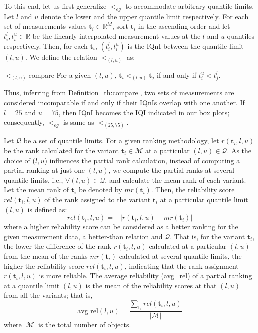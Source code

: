 \documentclass[acmsmall,screen, review]{acmart}
\begin{document}
To this end, let us first generalize $<_{eg}$ to accommodate arbitrary quantile limits. Let $l$ and $u$ denote  the lower and the upper quantile limit respectively. For each set of measurements values $\mathbf{t}_i \in \mathbb{R}^{M}$,  sort $\mathbf{t}_i$ in the ascending order and let $t_i^{l}, t_i^{u} \in \mathbb{R}$ be the linearly interpolated measurement values at the $l$ and $u$ quantiles respectively. Then, for each $\mathbf{t}_i$, $(t_i^{l}, t_i^{u})$ is the IQnI between the quantile limit $(l,u)$. We define the relation  $<_{(l,u)}$ as:

\begin{mydef}{$<_{(l,u)}$}{compare}
	For a given $(l, u)$, $\mathbf{t}_i <_{(l,u)} \mathbf{t}_j$ if and only if $t_i^{u} < t_j^{l}$.
\end{mydef}

\noindent  Thus, inferring from Definition~\ref{th:compare}, two sets of measurements are considered incomparable if and only if their IQnIs overlap with one another. If $l = 25$  and $u = 75$, then IQnI becomes the IQI indicated in our box plots; consequently, $<_{eg}$ is same as $<_{(25,75)}$.


Let $\mathcal{Q}$ be a set of quantile limits. For a given ranking methodology, let $r(\mathbf{t}_i, l, u)$ be the rank calculated for the variant $\mathbf{t}_i \in \mathcal{M}$ at a particular $(l, u) \in \mathcal{Q}$. As the choice of ($l, u$) influences the partial rank calculation, instead of computing a partial ranking at just one $(l,u)$, we compute the partial ranks at several quantile limits, i.e., $\forall (l,u) \in \mathcal{Q}$, and calculate the mean rank of each variant. Let the mean rank of $\mathbf{t}_i$ be denoted by $mr(\mathbf{t}_i)$. Then, the reliability score $rel(\mathbf{t}_i, l,u)$ of the rank assigned to the variant $\mathbf{t}_i$ at a particular quantile limit $(l,u)$ is defined as:
\begin{equation}
\label{eq:rel-eq}
rel(\mathbf{t}_i, l, u) = -|r(\mathbf{t}_i,l, u) - mr(\mathbf{t}_i)|
\end{equation}
where a higher reliability score can be considered as a better ranking for the given measurement data, a better-than relation and $\mathcal{Q}$. That is, for the variant $\mathbf{t}_i$, the lower the difference of the rank $r(\mathbf{t}_i, l,u)$ calculated at a particular $(l,u)$ from the mean of the ranks $mr(\mathbf{t}_i)$  calculated at several quantile limits, the higher the reliability score  $rel(\mathbf{t}_i, l, u)$, indicating that the rank assignment $r(\mathbf{t}_i, l,u)$ is more reliable. The average reliability (avg\_rel) of a partial ranking at a quantile limit $(l,u)$ is the mean of the reliability scores at that $(l,u)$ from all the variants; that is,
\begin{equation}
\text{avg\_rel}(l,u) = \frac{\sum\limits_{\mathbf{t}_i} rel(\mathbf{t}_i, l, u)}{|\mathcal{M}|} 
\end{equation}
where $|\mathcal{M}|$ is the total number of objects.
\end{document}
